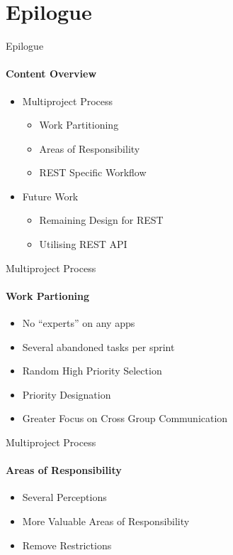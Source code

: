 \section{Epilogue}
    \begin{frame}[t]{Epilogue}\framesubtitle{Content Overview}
        \begin{itemize}
            \item Multiproject Process
            \begin{itemize}
                \item Work Partitioning
                \item Areas of Responsibility
                \item REST Specific Workflow
            \end{itemize}
            \item Future Work
            \begin{itemize}
                \item Remaining Design for REST
                \item Utilising REST API
            \end{itemize}
        \end{itemize}
    \end{frame}

    \begin{frame}[t]{Multiproject Process}\framesubtitle{Work Partioning}  
        \begin{itemize}
            \item No ``experts'' on any apps
            \item Several abandoned tasks per sprint
            \item Random High Priority Selection
            \item Priority Designation
            \item Greater Focus on Cross Group Communication
        \end{itemize}
    \end{frame}

    \begin{frame}[t]{Multiproject Process}\framesubtitle{Areas of Responsibility}
        \begin{itemize}
            \item Several Perceptions
            \item More Valuable Areas of Responsibility
            \item Remove Restrictions
        \end{itemize}
    \end{frame}

